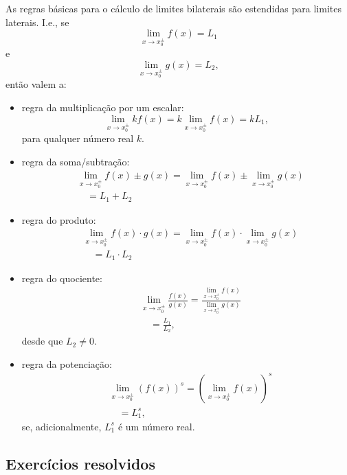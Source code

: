 \begin{obs}
  As regras básicas para o cálculo de limites bilaterais são estendidas para limites laterais. I.e., se
  \begin{equation}
    \lim_{x\to x_0^{\pm}} f(x) = L_1
  \end{equation}
  e
  \begin{equation}
    \lim_{x\to x_0^{\pm}} g(x) = L_2,
  \end{equation}
  então valem a:
  \begin{itemize}
\item regra da multiplicação por um escalar:
  \begin{equation}
    \lim_{x\to x_0^{\pm}} kf(x) = k\lim_{x\to x_0^{\pm}} f(x) = kL_1,
  \end{equation}
  para qualquer número real $k$.
\item regra da soma/subtração:
  \begin{align}
    & \lim_{x\to x_0^{\pm}} f(x) \pm g(x) = \lim_{x\to x_0^{\pm}} f(x) \pm \lim_{x\to x_0^{\pm}} g(x) \\
    & \text{}\quad = L_1 + L_2
  \end{align}
\item regra do produto:
  \begin{align}
    & \lim_{x\to x_0^\pm} f(x) \cdot g(x) = \lim_{x\to x_0^\pm} f(x) \cdot \lim_{x\to x_0^\pm} g(x) \\
    & \text{}\quad = L_1 \cdot L_2
  \end{align}
\item regra do quociente:
  \begin{align}
    & \lim_{x\to x_0^\pm} \frac{f(x)}{g(x)} = \frac{\lim_{x\to x_0^\pm} f(x)}{\lim_{x\to x_0^\pm} g(x)} \\
    & \text{}\quad = \frac{L_1}{L_2},
  \end{align}
  desde que $L_2\neq 0$.
\item regra da potenciação:
  \begin{align}
    & \lim_{x\to x_0^\pm} (f(x))^s = \left(\lim_{x\to x_0^\pm} f(x) \right)^s \\
    & \text{}\quad = L_1^s,
  \end{align}
  se, adicionalmente, $L_1^s$ é um número real.
\end{itemize}
\end{obs}

\subsection{Exercícios resolvidos}

